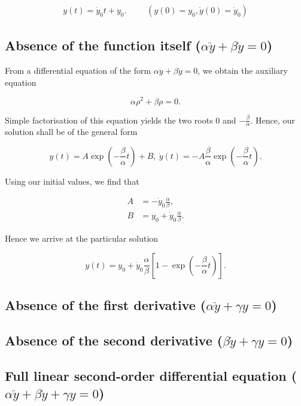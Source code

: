 \documentclass{article}
\begin{document}
\begin{align*}
	y(t) = \dot{y}_0t + y_0. &&& (y(0) = y_0, \dot{y}(0) = \dot{y}_0)
\end{align*}

\subsection{Absence of the function itself ($\alpha\ddot{y} + \beta\dot{y} = 0$)}

From a differential equation of the form $\alpha\ddot{y} + \beta\dot{y} = 0$, we obtain the auxiliary equation

\begin{equation*}
	\alpha\rho^2 + \beta\rho = 0.
\end{equation*}

Simple factorisation of this equation yields the two roots $0$ and $-\frac{\beta}{\alpha}$. Hence, our solution shall be of the general form

\begin{equation*}
	y(t) = A\exp\left(-\frac{\beta}{\alpha}t\right) + B, \: \dot{y}(t) = -A\frac{\beta}{\alpha}\exp\left(-\frac{\beta}{\alpha}t\right).
\end{equation*}

Using our initial values, we find that

\begin{align*}
	A &= -\dot{y}_0\frac{\alpha}{\beta}, \\
	B &= y_0 + \dot{y}_0\frac{\alpha}{\beta}.
\end{align*}

Hence we arrive at the particular solution

\begin{equation*}
	y(t) = y_0 + \dot{y}_0\frac{\alpha}{\beta}\left[1 - \exp\left(-\frac{\beta}{\alpha}t\right)\right].
\end{equation*}

\subsection{Absence of the first derivative ($\alpha\ddot{y} + \gamma y = 0$)}
\subsection{Absence of the second derivative ($\beta\dot{y} + \gamma y = 0$)}
\subsection{Full linear second-order differential equation ($\alpha\ddot{y} + \beta\dot{y} + \gamma y = 0$)}
\end{document}
